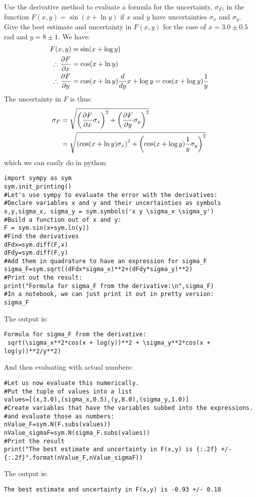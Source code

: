 \begin{example}{}{Use the derivative method to evaluate a formula for the uncertainty, $\sigma_{F}$, in the function $F(x,y)=\sin(x+\ln y)$ if $x$ and $y$ have uncertainties $\sigma_{x}$ and $\sigma_{y}$. Give the best estimate and uncertainty in $F(x,y)$ for the case of $x=3.0\pm0.5$\,rad and $y=8\pm1$.}{}
We have:
\begin{align*}
F(x,y)&=\sin(x+\log y)\\
\therefore \frac{\partial F}{\partial x}&=\cos(x+\ln y)\\
\therefore \frac{\partial F}{\partial y}&=\cos(x+\ln y)\frac{d}{dy}x+\log y=\cos(x+\log y)\frac{1}{y}
\end{align*}
The uncertainty in $F$ is thus:
\begin{align*}
\sigma_{F}&= \sqrt{\left(\frac{\partial F}{\partial x}\sigma_{x}\right)^2 + \left(\frac{\partial F}{\partial y} \sigma_{y}\right)^2}\\
  &= \sqrt{\left(\cos(x+\ln y)\sigma_{x}\right)^2 + \left(\cos(x+\log y)\frac{1}{y} \sigma_{y}\right)^2}\\
\end{align*}
which we can easily do in python:
\begin{lstlisting}[frame=single] 
import sympy as sym
sym.init_printing()
#Let's use sympy to evaluate the error with the derivatives:
#Declare variables x and y and their uncertainties as symbols
x,y,sigma_x, sigma_y = sym.symbols('x y \sigma_x \sigma_y')  
#Build a function out of x and y:
F = sym.sin(x+sym.ln(y)) 
#Find the derivatives
dFdx=sym.diff(F,x)
dFdy=sym.diff(F,y)
#Add them in quadrature to have an expression for sigma_F
sigma_F=sym.sqrt((dFdx*sigma_x)**2+(dFdy*sigma_y)**2)
#Print out the result:
print("Formula for sigma_F from the derivative:\n",sigma_F)
#In a notebook, we can just print it out in pretty version:
sigma_F
\end{lstlisting}
The output is:
\begin{verbatim}
Formula for sigma_F from the derivative:
 sqrt(\sigma_x**2*cos(x + log(y))**2 + \sigma_y**2*cos(x + log(y))**2/y**2)
\end{verbatim}
And then evaluating with actual numbers:
\begin{lstlisting}[frame=single] 
#Let us now evaluate this numerically.
#Put the tuple of values into a list
values=[(x,3.0),(sigma_x,0.5),(y,8.0),(sigma_y,1.0)]
#Create variables that have the variables subbed into the expressions.
#and evaluate those as numbers:
nValue_F=sym.N(F.subs(values))
nValue_sigmaF=sym.N(sigma_F.subs(values))
#Print the result
print("The best estimate and uncertainty in F(x,y) is {:.2f} +/- {:.2f}".format(nValue_F,nValue_sigmaF))
\end{lstlisting}
The output is:
\begin{verbatim}
The best estimate and uncertainty in F(x,y) is -0.93 +/- 0.18
\end{verbatim}
\end{example}


